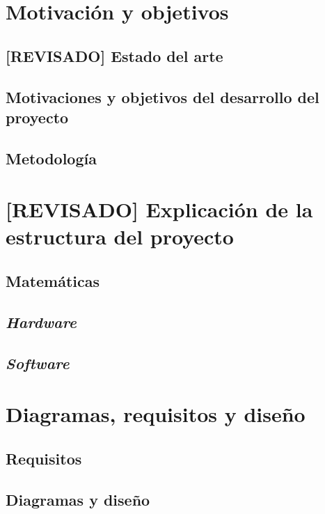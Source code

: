 \chapter{Motivación y objetivos}
\section{[REVISADO] Estado del arte}

\section{Motivaciones y objetivos del desarrollo del proyecto}

\section{Metodología}
\label{sec:methodology}


\chapter{[REVISADO] Explicación de la estructura del proyecto} 

\section{Matemáticas}

\section{\textit{Hardware}}

\section{\textit{Software}}


\chapter{Diagramas, requisitos y diseño}

\section{Requisitos}

\section{Diagramas y diseño}


